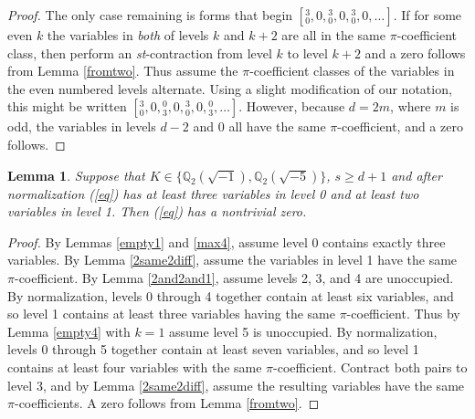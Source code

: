 \documentclass[12pt]{amsart}
\newtheorem{lemma}{Lemma}
\begin{document}
\begin{proof}
The only case remaining is forms that begin $[{}^{3}_{0}, 0, {}^{3}_{0}, 0, {}^{3}_{0}, 0, \ldots]$.  If for some even $k$ the variables in \textit{both} of levels $k$ and $k+2$ are all in the same $\pi$-coefficient class, then perform an \textit{st}-contraction from level $k$ to level $k+2$ and a zero follows from Lemma \ref{fromtwo}.  Thus assume the $\pi$-coefficient classes of the variables in the even numbered levels alternate.  Using a slight modification of our notation, this might be written $[{}^{3}_{0}, 0, {}^{0}_{3}, 0, {}^{3}_{0}, 0, {}^{0}_{3}, \ldots]$.  However, because $d=2m$, where $m$ is odd, the variables in levels $d-2$ and $0$ all have the same $\pi$-coefficient, and a zero follows.

\end{proof}

\begin{lemma} \label{max3again}
Suppose that $K \in \{\mathbb{Q}_2(\sqrt{-1}), \mathbb{Q}_2(\sqrt{-5})\}$, $s \ge d+1$ and after normalization (\ref{eq}) has at least three variables in level 0 and at least two variables in level 1.  Then (\ref{eq}) has a nontrivial zero.
\end{lemma}
\begin{proof}
 By Lemmas \ref{empty1} and \ref{max4}, assume level 0 contains exactly three variables.  By Lemma \ref{2same2diff}, assume the variables in level 1 have the same $\pi$-coefficient.  By Lemma \ref{2and2and1}, assume levels 2, 3, and 4 are unoccupied.  By normalization, levels 0 through 4 together contain at least six variables, and so level 1 contains at least three variables having the same $\pi$-coefficient. Thus by Lemma \ref{empty4} with $k=1$ assume level 5 is unoccupied.  By normalization, levels 0 through 5 together contain at least seven variables, and so level 1 contains at least four variables with the same $\pi$-coefficient.  Contract both pairs to level 3, and by Lemma \ref{2same2diff}, assume the resulting variables have the same $\pi$-coefficients.  A zero follows from Lemma \ref{fromtwo}.
\end{proof}
\end{document}
